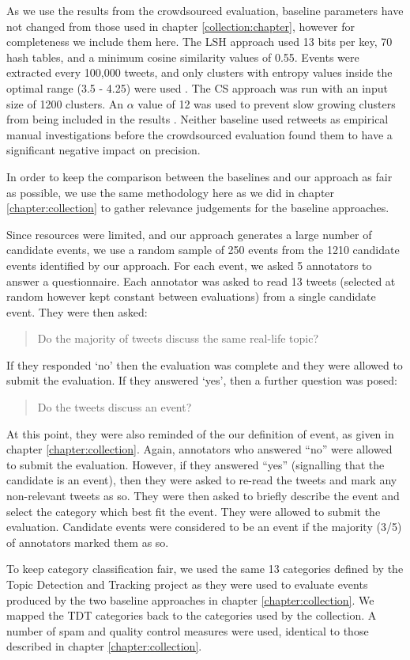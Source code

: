 As we use the results from the crowdsourced evaluation, baseline parameters have not changed from those used in chapter \ref{collection:chapter}, however for completeness we include them here.
The LSH approach used 13 bits per key, 70 hash tables, and a minimum cosine similarity values of 0.55. Events were extracted every 100,000 tweets, and only clusters with entropy values inside the optimal range (3.5 - 4.25) were used \citep{Petrovic10}.
The CS approach was run with an input size of 1200 clusters. An \(\alpha\) value of 12 was used to prevent slow growing clusters from being included in the results \citep{Aggarwal12}.
Neither baseline used retweets as empirical manual investigations before the crowdsourced evaluation found them to have a significant negative impact on precision.

\label{detection:sec:crowd}
In order to keep the comparison between the baselines and our approach as fair as possible, we use the same methodology here as we did in chapter \ref{chapter:collection} to gather relevance judgements for the baseline approaches.

Since resources were limited, and our approach generates a large number of candidate events, we use a random sample of 250 events from the 1210 candidate events identified by our approach.
For each event, we asked 5 annotators to answer a questionnaire.
Each annotator was asked to read 13 tweets (selected at random however kept constant between evaluations) from a single candidate event.
They were then asked: \blockquote{Do the majority of tweets discuss the same real-life topic?}.
If they responded `no' then the evaluation was complete and they were allowed to submit the evaluation.
If they answered `yes', then a further question was posed:
\blockquote{Do the tweets discuss an event?}.
At this point, they were also reminded of the our definition of event, as given in chapter \ref{chapter:collection}.
Again, annotators who answered ``no'' were allowed to submit the evaluation.
However, if they answered ``yes'' (signalling that the candidate is an event), then they were asked to re-read the tweets and mark any non-relevant tweets as so.
They were then asked to briefly describe the event and select the category which best fit the event.
They were allowed to submit the evaluation.
Candidate events were considered to be an event if the majority (3/5) of annotators marked them as so.

To keep category classification fair, we used the same 13 categories defined by the Topic Detection and Tracking project \citep{Allan:2002:ITD:772260.772262} as they were used to evaluate events produced by the two baseline approaches in chapter \ref{chapter:collection}. We mapped the TDT categories back to the categories used by the collection.
A number of spam and quality control measures were used, identical to those described in chapter \ref{chapter:collection}.